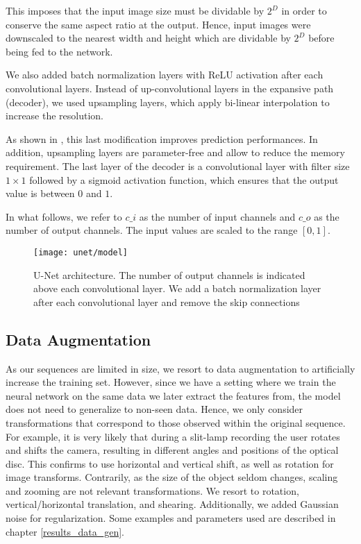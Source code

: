 This imposes that the input image size must be dividable by $2^{D}$ in order to conserve the same aspect ratio at the output.
Hence, input images were downscaled to the nearest width and height which are dividable by $2^{D}$ before being fed to the network.

We also added batch normalization layers with ReLU activation after each convolutional layers.
Instead of up-convolutional layers in the expansive path (decoder), we used upsampling layers, which apply bi-linear interpolation to increase the resolution.

As shown in \cite{vorontsov17}, this last modification improves prediction performances.
In addition, upsampling layers are parameter-free and allow to reduce the memory requirement.
The last layer of the decoder is a convolutional layer with filter size $1 \times 1$ followed by a sigmoid activation function, which ensures that the output value is between $0$ and $1$.

In what follows, we refer to $c\_i$ as the number of input channels and $c\_o$ as the number of output channels.
The input values are scaled to the range $[0,1]$.

\clearpage
\begin{figure}[!htbp]
  \centering
  \texttt{[image: unet/model]}
  \caption[Modified U-Net architecture]{U-Net architecture.
    The number of output channels is indicated above each convolutional layer.
    We add a batch normalization layer after each convolutional layer and remove the skip connections}
  \label{fig:unet_model}
\end{figure}

\subsection{Data Augmentation} \label{ch:data_gen}
As our sequences are limited in size, we resort to data augmentation to artificially increase the training set.
However, since we have a setting where we train the neural network on the same data we later extract the features from, the model does not need to generalize to non-seen data.
Hence, we only consider transformations that correspond to those observed within the original sequence.
For example, it is very likely that during a slit-lamp recording the user rotates and shifts the camera, resulting in different angles and positions of the optical disc.
This confirms to use horizontal and vertical shift, as well as rotation for image transforms.
Contrarily, as the size of the object seldom changes, scaling and zooming are not relevant transformations.
We resort to rotation, vertical/horizontal translation, and shearing.
Additionally, we added Gaussian noise for regularization.
Some examples and parameters used are described in chapter \ref{results_data_gen}.

